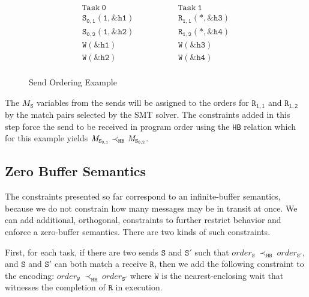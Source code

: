 \begin{figure}[h]
\[
\begin{array}{l|l}
\;\;\;\;\;\;\;\;\mathtt{Task\ 0}\;\;\;\;\;\;\;\; & \;\;\;\;\;\;\;\; \mathtt{Task\ 1}\;\;\;\;\;\;\;\; \\
\hline
\;\;\;\;\;\;\;\;\mathtt{S_{0,1}(1,\&h1)}\;\;\;\;\;\;\;\; & \;\;\;\;\;\;\;\; \mathtt{R_{1,1}(*,\&h3)}\;\;\;\;\;\;\;\; \\
\;\;\;\;\;\;\;\;\mathtt{S_{0,2}(1,\&h2)}\;\;\;\;\;\;\;\; & \;\;\;\;\;\;\;\; \mathtt{R_{1,2}(*,\&h4)}\;\;\;\;\;\;\;\; \\
\;\;\;\;\;\;\;\;\mathtt{W(\&h1)}\;\;\;\;\;\;\;\; & \;\;\;\;\;\;\;\; \mathtt{W(\&h3)}\;\;\;\;\;\;\;\; \\
\;\;\;\;\;\;\;\;\mathtt{W(\&h2)}\;\;\;\;\;\;\;\; & \;\;\;\;\;\;\;\; \mathtt{W(\&h4)}\;\;\;\;\;\;\;\; \\
\end{array}
\]
\caption{Send Ordering Example} \label{fig:step4}
\end{figure}

The $\mathit{M_\mathtt{S}}$ variables from the sends will be assigned to the orders
for $\mathtt{R_{1,1}}$ and $\mathtt{R_{1,2}}$ by the match pairs
selected by the SMT solver. The constraints added in this step force
the send to be received in program order using the \texttt{HB}
relation which for this example yields
$\cfgnt{M}_\mathtt{S_{0,1}}\ \mathrm{\prec_\mathtt{HB}}\ \cfgnt{M}_\mathtt{S_{0,2}}$.

\subsection{Zero Buffer Semantics}

The constraints presented so far correspond to an infinite-buffer
semantics, because we do not constrain how many messages may be in
transit at once. We can add additional, orthogonal, constraints to
further restrict behavior and enforce a zero-buffer semantics. There are
two kinds of such constraints.

First, for each task, if there are two sends $\mathtt{S}$ and
$\mathtt{S'}$ such that
$\mathit{order}_\mathtt{S}\ \mathrm{\prec_\mathtt{HB}}\ \mathit{order}_\mathtt{S'}$,
and $\mathtt{S}$ and $\mathtt{S'}$ can both match a receive
$\mathtt{R}$, then we add the following constraint to the encoding:
$\mathit{order}_{\mathtt{W}}\ \mathrm{\prec_{\mathtt{HB}}}\ \mathit{order}_{\mathtt{S'}}$
where $\mathtt{W}$ is the nearest-enclosing wait that witnesses the
completion of $\mathtt{R}$ in execution.

